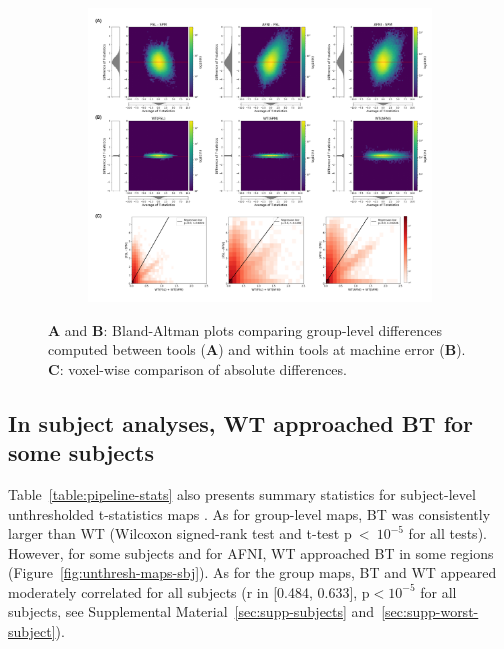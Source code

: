 \documentclass[11pt,onecolumn]{article}
\begin{document}
\begin{figure}[ht]
  \centering
  \begin{subfigure}[ht]{.9\textwidth}
    \centering
    \includegraphics[width=.9\textwidth]{figures/gl-unthresh.png}
  \end{subfigure}
  \caption{\textbf{A} and \textbf{B}: Bland-Altman plots comparing group-level differences computed between tools
    (\textbf{A}) and within tools at machine error (\textbf{B}). \textbf{C}: voxel-wise comparison of absolute differences.}
  \label{fig:unthresh-maps}
\end{figure}


\subsection{In subject analyses, WT approached BT for some subjects}

Table~\ref{table:pipeline-stats} also presents summary statistics for
subject-level unthresholded t-statistics maps . As for group-level maps,
BT was consistently larger than WT (Wilcoxon
signed-rank test and t-test p~\textless~$10^{-5}$ for all tests).
However, for
some subjects and for AFNI, WT approached 
BT in some regions (Figure~\ref{fig:unthresh-maps-sbj}). As for the group maps, BT and WT
 appeared moderately correlated for all subjects (r in [0.484,
    0.633], p$< 10^{-5}$ for all subjects, see Supplemental Material~\ref{sec:supp-subjects} and~\ref{sec:supp-worst-subject}).
\end{document}
